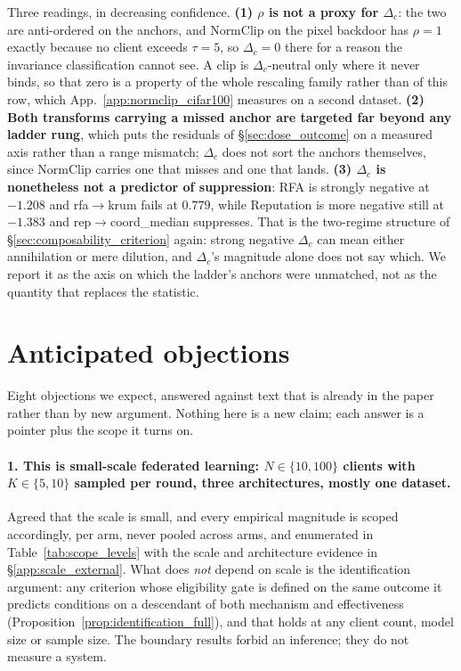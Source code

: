\documentclass{article}
\begin{document}
\noindent Three readings, in decreasing confidence. \textbf{(1) $\rho$ is not a proxy for $\Delta_c$}: the two are anti-ordered on the anchors, and NormClip on the pixel backdoor has $\rho = 1$ exactly because no client exceeds $\tau{=}5$, so $\Delta_c = 0$ there for a reason the invariance classification cannot see. A clip is $\Delta_c$-neutral only where it never binds, so that zero is a property of the whole rescaling family rather than of this row, which App.~\ref{app:normclip_cifar100} measures on a second dataset. \textbf{(2) Both transforms carrying a missed anchor are targeted far beyond any ladder rung}, which puts the residuals of §\ref{sec:dose_outcome} on a measured axis rather than a range mismatch; $\Delta_c$ does not sort the anchors themselves, since NormClip carries one that misses and one that lands. \textbf{(3) $\Delta_c$ is nonetheless not a predictor of suppression}: RFA is strongly negative at $-1.208$ and rfa$\to$krum fails at $0.779$, while Reputation is more negative still at $-1.383$ and rep$\to$coord\_median suppresses. That is the two-regime structure of §\ref{sec:composability_criterion} again: strong negative $\Delta_c$ can mean either annihilation or mere dilution, and $\Delta_c$'s magnitude alone does not say which. We report it as the axis on which the ladder's anchors were unmatched, not as the quantity that replaces the statistic.

\section{Anticipated objections}
\label{app:objections}

Eight objections we expect, answered against text that is already in the paper rather than by new
argument. Nothing here is a new claim; each answer is a pointer plus the scope it turns on.

\paragraph{1. This is small-scale federated learning: $N \in \{10,100\}$ clients with $K \in \{5,10\}$
sampled per round, three architectures, mostly one dataset.} Agreed that the scale is small, and every
empirical magnitude is scoped accordingly, per arm, never pooled across
arms, and enumerated in Table~\ref{tab:scope_levels} with the scale and architecture evidence in
§\ref{app:scale_external}. What does \emph{not} depend on scale is the
identification argument: any criterion whose eligibility gate is defined on the same outcome it predicts
conditions on a descendant of both mechanism and effectiveness
(Proposition~\ref{prop:identification_full}), and that holds at any client count, model size or sample size.
The boundary results forbid an inference; they do not measure a system.
\end{document}

